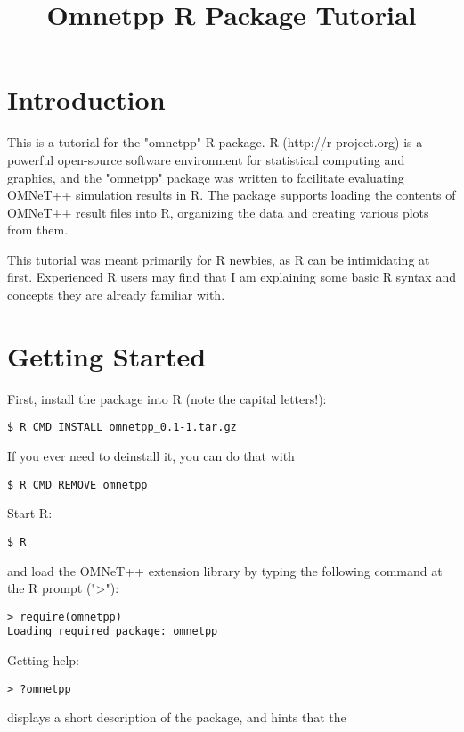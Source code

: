 \title{Omnetpp R Package Tutorial}


\section{Introduction}

This is a tutorial for the "omnetpp" R package. R (http://r-project.org) is a 
powerful open-source software environment for statistical computing and graphics,
and the "omnetpp" package was written to facilitate evaluating OMNeT++ simulation 
results in R. The package supports loading the contents of OMNeT++ result files 
into R, organizing the data and creating various plots from them.

This tutorial was meant primarily for R newbies, as R can be intimidating at first.
Experienced R users may find that I am explaining some basic R syntax and concepts 
they are already familiar with.


\section{Getting Started}

First, install the package into R (note the capital letters!):

\begin{verbatim}
$ R CMD INSTALL omnetpp_0.1-1.tar.gz
\end{verbatim}

If you ever need to deinstall it, you can do that with

\begin{verbatim}
$ R CMD REMOVE omnetpp
\end{verbatim}

Start R:

\begin{verbatim}
$ R
\end{verbatim}

and load the OMNeT++ extension library by typing the following command at the R prompt (">"):

\begin{verbatim}
> require(omnetpp)
Loading required package: omnetpp
\end{verbatim}

Getting help:

\begin{verbatim}
> ?omnetpp
\end{verbatim}

displays a short description of the package, and hints that the

